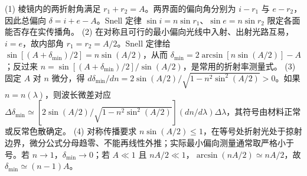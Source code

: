 (1) 棱镜内的两折射角满足 \(r_1+r_2=A\)。两界面的偏向角分别为 \(i-r_1\) 与 \(e-r_2\)，因此总偏向 \(\delta=i+e-A\)。Snell 定律 \( \sin i=n\sin r_1\)、\(\sin e=n\sin r_2\) 限定各面能否存在实传播角。
(2) 在对称且可行的最小偏向光线中入射、出射光路互易，\(i=e\)，故内部角 \(r_1=r_2=A/2\)。Snell 定律给 \(\sin[(A+\delta_{\min})/2]=n\sin(A/2)\)，从而 \(\delta_{\min}=2\arcsin[n\sin(A/2)]-A\)；反过来 \(n=\sin[(A+\delta_{\min})/2]/\sin(A/2)\)，是常用的折射率测量式。
(3) 固定 \(A\) 对 \(n\) 微分，得 \(d\delta_{\min}/dn=2\sin(A/2)/\sqrt{1-n^2\sin^2(A/2)}>0\)。如果 \(n=n(\lambda)\)，则波长微差对应 \(\Delta\delta_{\min}\simeq[2\sin(A/2)/\sqrt{1-n^2\sin^2(A/2)}](dn/d\lambda)\Delta\lambda\)，其符号由材料正常或反常色散确定。
(4) 对称传播要求 \(n\sin(A/2)\le1\)，在等号处折射光处于掠射边界，微分公式分母趋零、不能再线性外推；实际最小偏向测量通常取严格小于号。若 \(n\to1\)，\(\delta_{\min}\to0\)；若 \(A\ll1\) 且 \(nA/2\ll1\)，\(\arcsin(nA/2)\simeq nA/2\)，故 \(\delta_{\min}\simeq(n-1)A\)。
